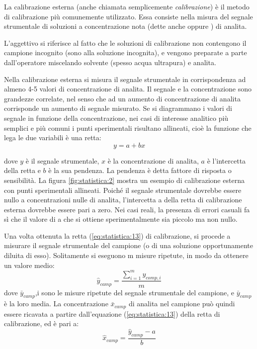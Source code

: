La calibrazione esterna (anche chiamata semplicemente \emph{calibrazione}) è il metodo di calibrazione più comunemente utilizzato. Essa consiste nella misura del segnale strumentale di soluzioni a concentrazione nota (dette anche  oppure ) di analita.

L'aggettivo  si riferisce al fatto che le soluzioni di calibrazione non contengono il campione incognito (sono  alla soluzione incognita), e vengono preparate a parte dall'operatore miscelando solvente (spesso acqua ultrapura) e analita.

Nella calibrazione esterna si misura il segnale strumentale in corrispondenza ad almeno 4-5 valori di concentrazione di analita. Il segnale e la concentrazione sono grandezze correlate, nel senso che ad un aumento di concentrazione di analita corrisponde un aumento di segnale misurato. Se si diagrammano i valori di segnale in funzione della concentrazione, nei casi di interesse analitico più semplici e più comuni i punti sperimentali risultano allineati, cioè la funzione che lega le due variabili è una retta:
\begin{equation} \label{eq:statistica:13}
y = a + bx
\end{equation}

dove $y$ è il segnale strumentale, $x$ è la concentrazione di analita, $a$ è l'intercetta della retta e $b$ è la sua pendenza. La pendenza è detta fattore di risposta o sensibilità. La figura \ref{fig:statistica:2} mostra un esempio di calibrazione esterna con punti sperimentali allineati. Poiché il segnale strumentale dovrebbe essere nullo a concentrazioni nulle di analita, l'intercetta a della retta di calibrazione esterna dovrebbe essere pari a zero. Nei casi reali, la presenza di errori casuali fa sì che il valore di a che si ottiene sperimentalmente sia piccolo ma non nullo.


Una volta ottenuta la retta (\ref{eq:statistica:13}) di calibrazione, si procede a misurare il segnale strumentale del campione (o di una soluzione opportunamente diluita di esso). Solitamente si eseguono m misure ripetute, in modo da ottenere un valore medio:
\begin{equation} \label{eq:statistica:14}
\hat{y}_{camp} = \frac{\sum_{i=1}^m y_{comp,i}}{m}
\end{equation}
dove $\bar{y}_{camp}$,i sono le misure ripetute del segnale strumentale del campione, e $\bar{y}_{camp}$ è la loro media. La concentrazione $\bar{x}_{camp}$ di analita nel campione può quindi essere ricavata a partire dall'equazione (\ref{eq:statistica:13}) della retta di calibrazione, ed è pari a:
\begin{equation} \label{eq:statistica:15}
\hat{x}_{camp} = \frac{\hat{y}_{camp} - a}{b}
\end{equation}


